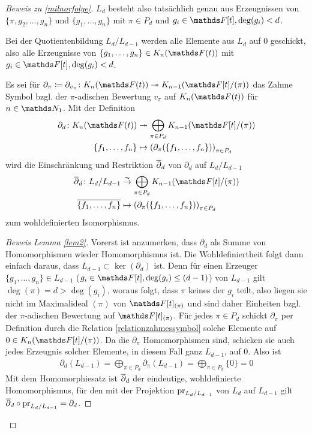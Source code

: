 \documentclass[ngerman,fontsize=11pt, paper=a4, parskip=half, titlepage=true, toc=bib]{scrartcl}
\begin{document}
\begin{proof}[Beweis zu \ref{milnorfolge}]
  $L_d$ besteht also tatsächlich genau aus Erzeugnissen von
  $\{\pi,g_2,\dotsc,g_n\}$ und $\{g_1,\dotsc,g_n\}$
  mit $\pi\in P_d$ und $g_i\in\F[t], \deg(g_i)<d$.

  Bei der Quotientenbildung $L_d/L_{d-1}$ werden alle Elemente aus
  $L_d$ auf $0$ geschickt, also alle Erzeugnisse von
  $\{g_1,\dotsc,g_n\}\in\KnFt$ mit $g_i\in\F[t], \deg(g_i)<d$.

  \begin{Lem}[\ref{2}]\label{lem2}
    Es sei für $\partial_\pi\coloneqq \partial_{v_\pi}\colon
    \KnFt\twoheadrightarrow\K_{n-1}(\Ftpi)$
    das Zahme Symbol bzgl. der $\pi$-adischen Bewertung $v_\pi$ auf
    $\KnFt$ für $n\in\N_1$.
    Mit der Definition
    \begin{align*}
      \partial_d\colon \KnFt
      &\twoheadrightarrow \bigoplus_{\pi\in
        P_d}\K_{n-1}(\Ftpi)\\
      \{f_1,\dotsc,f_n\}
      &\mapsto\left(
        \partial_\pi(\{f_1,\dotsc,f_n\})
        \right)_{\pi\in P_d}
    \end{align*}
    wird die Einschränkung und Restriktion $\overline{\partial}_d$ 
    von $\partial_d$ auf $L_d/L_{d-1}$
    \begin{align*}
      \ov{\partial}_d\colon L_d/L_{d-1}
      &\overset{\thicksim}{\rightarrow} \bigoplus_{\pi\in
        P_d}\K_{n-1}(\Ftpi)\\
      \ov{\{f_1,\dotsc,f_n\}}
      &\mapsto\left(
        \partial_\pi(\{f_1,\dotsc,f_n\})
        \right)_{\pi\in P_d}
    \end{align*}
    zum wohldefinierten Isomorphismus.
  \end{Lem}
  \begin{proof}[Beweis Lemma \ref{lem2}]
    Vorerst ist anzumerken, dass $\partial_d$ als Summe von
    Homomorphismen wieder Homomorphismus ist.
    Die Wohldefiniertheit folgt dann einfach daraus, dass $L_{d-1}\subset
    \ker(\partial_d)$ ist.
    Denn für einen Erzeuger
    $\{g_1,\dotsc,g_n\}\in L_{d-1}$ ($g_i\in\F[t],\deg(g_i)\leq (d-1)$)
    von $L_{d-1}$  gilt $\deg(\pi)=d>\deg(g_i)$, 
    woraus folgt, dass $\pi$ keines der $g_i$
    teilt, also liegen sie nicht im Maximalideal $(\pi)$ von
    $\F[t]_{(\pi)}$ und sind daher Einheiten bzgl. der $\pi$-adischen
    Bewertung auf $\F[t]_{(\pi)}$. Für jedes $\pi\in P_d$ schickt
    $\partial_\pi$ per Definition durch die Relation 
    \ref{relationzahmessymbol} solche Elemente auf $0\in\KnFtpi$.
    Da die $\partial_\pi$ Homomorphismen sind, schicken sie auch jedes
    Erzeugnis solcher Elemente, in diesem Fall ganz $L_{d-1}$, auf $0$.
    Also ist 
    \begin{gather*}
      \partial_d(L_{d-1})=\bigoplus_{\pi\in
        P_d}\partial_{\pi}(L_{d-1})=\bigoplus_{\pi\in P_d} \{0\}=0
    \end{gather*}
    Mit dem Homomorphiesatz ist $\overline\partial_d$ der eindeutige,
    wohldefinierte Homomorphismus, für den mit der Projektion
    $\operatorname{pr}_{L_d/L_{d-1}}$ von $L_d$ auf $L_{d-1}$ gilt
    $\overline\partial_d\circ \operatorname{pr}_{L_d/L_{d-1}}=\partial_d$.
    

\end{proof}
\end{proof}
\end{document}
